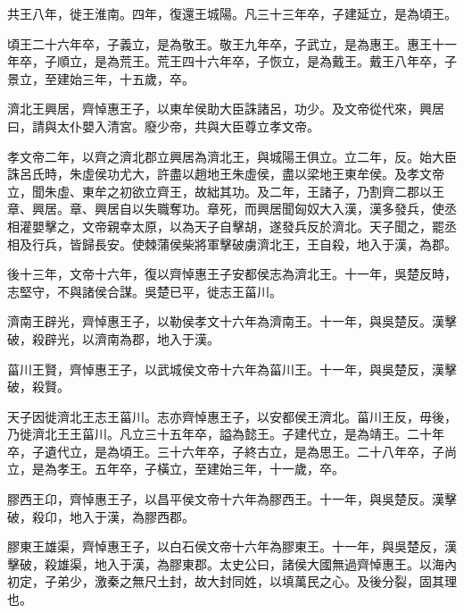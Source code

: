 共王八年，徙王淮南。四年，復還王城陽。凡三十三年卒，子建延立，是為頃王。

頃王二十六年卒，子義立，是為敬王。敬王九年卒，子武立，是為惠王。惠王十一年卒，子順立，是為荒王。荒王四十六年卒，子恢立，是為戴王。戴王八年卒，子景立，至建始三年，十五歲，卒。

濟北王興居，齊悼惠王子，以東牟侯助大臣誅諸呂，功少。及文帝從代來，興居曰，請與太仆嬰入清宮。廢少帝，共與大臣尊立孝文帝。

孝文帝二年，以齊之濟北郡立興居為濟北王，與城陽王俱立。立二年，反。始大臣誅呂氏時，朱虛侯功尤大，許盡以趙地王朱虛侯，盡以梁地王東牟侯。及孝文帝立，聞朱虛、東牟之初欲立齊王，故絀其功。及二年，王諸子，乃割齊二郡以王章、興居。章、興居自以失職奪功。章死，而興居聞匈奴大入漢，漢多發兵，使丞相灌嬰擊之，文帝親幸太原，以為天子自擊胡，遂發兵反於濟北。天子聞之，罷丞相及行兵，皆歸長安。使棘蒲侯柴將軍擊破虜濟北王，王自殺，地入于漢，為郡。

後十三年，文帝十六年，復以齊悼惠王子安都侯志為濟北王。十一年，吳楚反時，志堅守，不與諸侯合謀。吳楚已平，徙志王菑川。

濟南王辟光，齊悼惠王子，以勒侯孝文十六年為濟南王。十一年，與吳楚反。漢擊破，殺辟光，以濟南為郡，地入于漢。

菑川王賢，齊悼惠王子，以武城侯文帝十六年為菑川王。十一年，與吳楚反，漢擊破，殺賢。

天子因徙濟北王志王菑川。志亦齊悼惠王子，以安都侯王濟北。菑川王反，毋後，乃徙濟北王王菑川。凡立三十五年卒，謚為懿王。子建代立，是為靖王。二十年卒，子遺代立，是為頃王。三十六年卒，子終古立，是為思王。二十八年卒，子尚立，是為孝王。五年卒，子橫立，至建始三年，十一歲，卒。

膠西王卬，齊悼惠王子，以昌平侯文帝十六年為膠西王。十一年，與吳楚反。漢擊破，殺卬，地入于漢，為膠西郡。

膠東王雄渠，齊悼惠王子，以白石侯文帝十六年為膠東王。十一年，與吳楚反，漢擊破，殺雄渠，地入于漢，為膠東郡。太史公曰，諸侯大國無過齊悼惠王。以海內初定，子弟少，激秦之無尺土封，故大封同姓，以填萬民之心。及後分裂，固其理也。